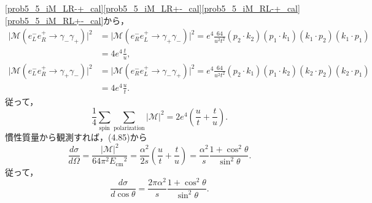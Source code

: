 \eqref{prob5_5_iM_LR-+_cal}\eqref{prob5_5_iM_LR+-_cal}\eqref{prob5_5_iM_RL-+_cal}\eqref{prob5_5_iM_RL+-_cal}から，
\begin{align*}
  \lvert \mathcal{M}(e^-_L e^+_R \to \gamma_-\gamma_+) \rvert^2 &= \lvert \mathcal{M}(e^-_R e^+_L \to \gamma_+\gamma_-) \rvert^2
   = e^4 \frac{64}{u^2t^2} (p_2 \cdot k_2) (p_1 \cdot k_1) (k_1 \cdot p_2) (k_1 \cdot p_1) \\
   &= 4 e^4 \frac{t}{u} , \\
  \lvert \mathcal{M}(e^-_L e^+_R \to \gamma_+\gamma_-) \rvert^2 &= \lvert \mathcal{M}(e^-_R e^+_L \to \gamma_-\gamma_+) \rvert^2
   = e^4 \frac{64}{u^2t^2} (p_2 \cdot k_1) (p_1 \cdot k_2) (k_2 \cdot p_2) (k_2 \cdot p_1) \\
   &= 4 e^4 \frac{u}{t} .
\end{align*}
従って，
\[ \frac{1}{4} \sum_\text{spin} \sum_\text{polarization} \lvert\mathcal{M}\rvert^2 = 2e^4 \left( \frac{u}{t} + \frac{t}{u} \right) . \]
慣性質量から観測すれば，(4.85)から
\[ \frac{d\sigma}{d\Omega} = \frac{\lvert\mathcal{M}\rvert^2}{64\pi^2E_\text{cm}{^2}} = \frac{\alpha^2}{2s} \left( \frac{u}{t} + \frac{t}{u} \right)
 = \frac{\alpha^2}{s} \frac{1+\cos^2\theta}{\sin^2\theta} . \]
従って，
\[ \frac{d\sigma}{d\cos\theta} = \frac{2\pi\alpha^2}{s} \frac{1+\cos^2\theta}{\sin^2\theta} . \]
